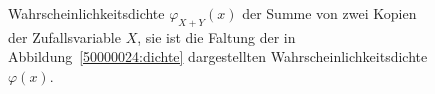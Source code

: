 \begin{loesung}
\begin{teilaufgaben}
\begin{figure}
\caption{Wahrscheinlichkeitsdichte $\varphi_{X+Y}(x)$ der Summe von zwei Kopien
der Zufallsvariable $X$, sie ist die Faltung der in Abbildung~\ref{50000024:dichte}
dargestellten Wahrscheinlichkeitsdichte $\varphi(x)$.
\label{50000024:summe}}
\end{figure}
\end{teilaufgaben}
\end{loesung}

